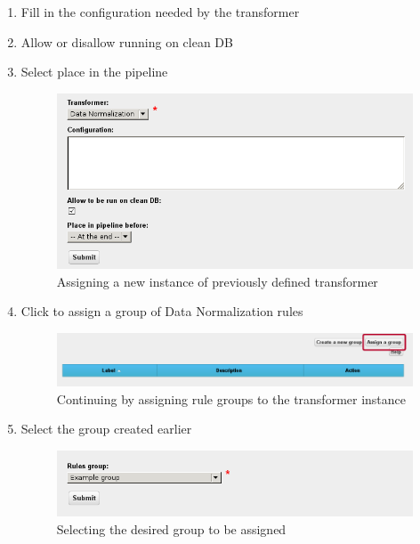 \begin{enumerate}[resume]
	\item Fill in the configuration needed by the transformer
	\item Allow or disallow running on clean DB
	\item Select place in the pipeline

\begin{figure}[!ht]
    \centering
    \includegraphics[width=\textwidth]{images/fe-walkthrough-new-transformer-assignment.png}
    \caption{Assigning a new instance of previously defined transformer}
	\label{fig:feWTNewTransformerAssignment}
\end{figure}
\FloatBarrier

\newpage
\vspace*{0.2\textheight}

	\item Click  to assign a group of Data Normalization rules

\begin{figure}[!ht]
    \centering
    \includegraphics[width=\textwidth]{images/fe-walkthrough-assign-group.png}
    \caption{Continuing by assigning rule groups to the transformer instance}
	\label{fig:feWTAssignGroup}
\end{figure}
\FloatBarrier

\vspace*{0.2\textheight}

	\item Select the group created earlier

\begin{figure}[!ht]
    \centering
    \includegraphics[width=\textwidth]{images/fe-walkthrough-new-group-assignment.png}
    \caption{Selecting the desired group to be assigned}
	\label{fig:feWTNewGroupAssignment}
\end{figure}

\end{enumerate}

